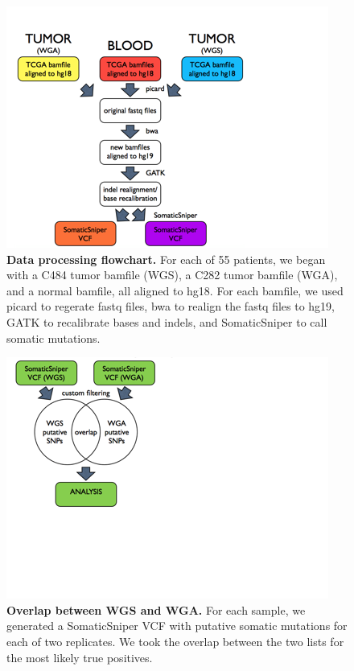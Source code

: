 \documentclass[11pt]{article} %
\begin{document}
\begin{figure}
\includegraphics[scale=1.0]{data_processing_flowchart_2.png}
\caption{\textbf{Data processing flowchart.} For each of 55 patients, we began with a C484 tumor bamfile (WGS), a C282 tumor bamfile (WGA), and a normal bamfile, all aligned to hg18. For each bamfile, we used picard to regerate fastq files, bwa to realign the fastq files to hg19, GATK to recalibrate bases and indels, and SomaticSniper to call somatic mutations.}
\end{figure}

\begin{figure}
\includegraphics[scale=1.0]{overlap_explained.png}
\caption{\textbf{Overlap between WGS and WGA.} For each sample, we generated a SomaticSniper VCF with putative somatic mutations for each of two replicates. We took the overlap between the two lists for the most likely true positives.}
\end{figure}
\end{document}
